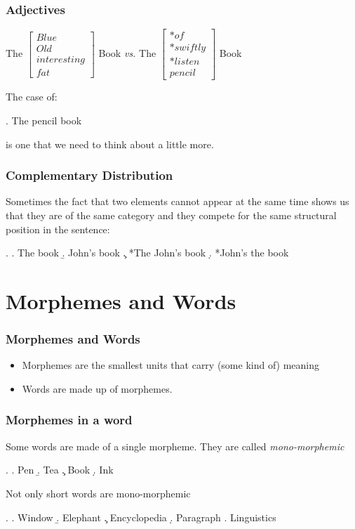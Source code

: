 \begin{frame}
  \frametitle{Adjectives}


The $ \left[ \begin{array}{l}Blue\\Old\\interesting\\fat \end{array} \right] $ Book \emph{vs.} The $ \left[ \begin{array}{l}*of\\ *swiftly\\ *listen \\ pencil  \end{array} \right]$ Book

\bigskip

The case of:


\ex.  The pencil book


is one that we need to think about a little more.

\end{frame}


\begin{frame}
\frametitle{Complementary Distribution}

Sometimes the fact that two elements cannot appear at the same time shows us that they are of the same category and they compete for the same structural position in the sentence:

\ex.
\a. The book
\b. John's book
\c. *The John's book
\d. *John's the book

\end{frame}

\section{Morphemes and Words}
\begin{frame}[fragile]
\frametitle{Morphemes and Words}

\begin{itemize}
\item Morphemes are the smallest units that carry (some kind of) meaning
\item Words are made up of morphemes.
\end{itemize}

\end{frame}


\begin{frame}
\frametitle{Morphemes in a word}
  Some words are made of a single morpheme.  They are called \textit{mono-morphemic}

\ex.
\a. Pen
\b. Tea
\c. Book
\d. Ink

Not only short words are mono-morphemic

\ex.
\a. Window
\b. Elephant
\c. Encyclopedia
\d. Paragraph
\e. Linguistics

\end{frame}


